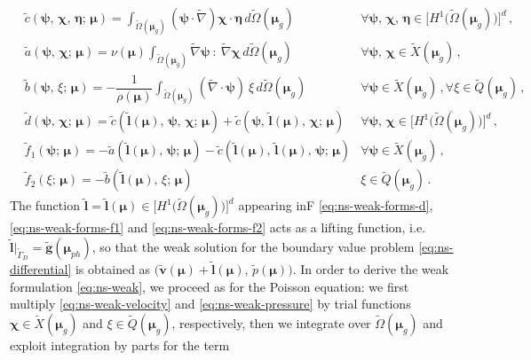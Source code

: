 \documentclass[12pt, a4paper, twoside, openright, notitlepage]{report}
\numberwithin{equation}{chapter}
\theoremstyle{theorem}
\theoremstyle{definition}
\theoremstyle{remark}
\theoremstyle{proposition}
\numberwithin{figure}{chapter}
\newcommand{\wt}[1]{\widetilde{#1}}
\newcommand{\bg}[1]{\boldsymbol{#1}}
\begin{document}
		\begin{subequations}
			\label{eq:ns-weak-forms}
			\begin{align}
				\label{eq:ns-weak-forms-c}
				& \wt{c}(\bg{\psi}, \, \bg{\chi}, \, \bg{\eta}; \, \bg{\mu}) = \int_{\wt{\Omega}(\bg{\mu}_g)} \left( \bg{\psi} \cdot \wt{\nabla} \right) \bg{\chi} \cdot \bg{\eta} \, d\wt{\Omega}(\bg{\mu}_g) & \forall \bg{\psi}, \, \bg{\chi}, \, \bg{\eta} \in \big[ H^1 \big( \wt{\Omega}(\bg{\mu}_g) \big) \big]^d \, , \\[0.2cm]
				\label{eq:ns-weak-forms-a}
				& \wt{a}(\bg{\psi}, \, \bg{\chi}; \, \bg{\mu}) = \nu(\bg{\mu}) \int_{\wt{\Omega}(\bg{\mu}_g)} \wt{\nabla} \bg{\psi} ~ : ~ \wt{\nabla} \bg{\chi} \, d\wt{\Omega}(\bg{\mu}_g) & \forall \bg{\psi}, \, \bg{\chi} \in \wt{X}(\bg{\mu}_g) \, , \\[0.2cm]
				\label{eq:ns-weak-forms-b}
				& \wt{b}(\bg{\psi}, \, \xi; \, \bg{\mu}) = - \dfrac{1}{\rho(\bg{\mu})} \int_{\wt{\Omega}(\bg{\mu}_g)} \left( \wt{\nabla} \cdot \bg{\psi} \right) ~ \xi \, d\wt{\Omega}(\bg{\mu}_g) & \forall \bg{\psi} \in \wt{X}(\bg{\mu}_g) \, , \forall \xi \in \wt{Q}(\bg{\mu}_g) \, , \\[0.2cm]
				\label{eq:ns-weak-forms-d}
				& \wt{d}(\bg{\psi}, \, \bg{\chi}; \, \bg{\mu}) = \wt{c}(\wt{\bg{l}}(\bg{\mu}), \, \bg{\psi}, \, \bg{\chi}; \, \bg{\mu}) + \wt{c}(\bg{\psi}, \, \wt{\bg{l}}(\bg{\mu}), \, \bg{\chi}; \, \bg{\mu}) & \forall \bg{\psi}, \, \bg{\chi} \in \big[ H^1 \big( \wt{\Omega}(\bg{\mu}_g) \big) \big]^d \, , \\[0.2cm]
				\label{eq:ns-weak-forms-f1}
				& \wt{f}_1(\bg{\psi}; \, \bg{\mu}) = -\wt{a}(\wt{\bg{l}}(\bg{\mu}), \, \bg{\psi}; \, \bg{\mu}) - \wt{c}(\wt{\bg{l}}(\bg{\mu}), \, \wt{\bg{l}}(\bg{\mu}), \, \bg{\psi}; \, \bg{\mu}) & \forall \bg{\psi} \in \wt{X}(\bg{\mu}_g) \, , \\[0.2cm]
				\label{eq:ns-weak-forms-f2}
				& \wt{f}_2(\xi; \, \bg{\mu}) = - \wt{b}(\wt{\bg{l}}(\bg{\mu}), \, \xi; \, \bg{\mu}) & \xi \in \wt{Q}(\bg{\mu}_g) \, .
			\end{align}
		\end{subequations}
		The function $\wt{\bg{l}} = \wt{\bg{l}}(\bg{\mu}) \in \big[ H^1 \big( \wt{\Omega}(\bg{\mu}_g) \big) \big]^d$ appearing inF \eqref{eq:ns-weak-forms-d}, \eqref{eq:ns-weak-forms-f1} and \eqref{eq:ns-weak-forms-f2} acts as a lifting function, i.e. $\wt{\bg{l}} \vert_{\wt{\Gamma}_D} = \wt{\bg{g}}(\bg{\mu}_{ph})$, so that the weak solution for the boundary value problem \eqref{eq:ns-differential} is obtained as $\big( \wt{\bg{v}}(\bg{\mu}) + \wt{\bg{l}}(\bg{\mu}), \, \wt{p}(\bg{\mu}) \big)$. In order to derive the weak formulation \eqref{eq:ns-weak}, we proceed as for the Poisson equation: we first multiply \eqref{eq:ns-weak-velocity} and \eqref{eq:ns-weak-pressure} by trial functions $\bg{\chi} \in \wt{X}(\bg{\mu}_g)$ and $\xi \in \wt{Q}(\bg{\mu}_g)$, respectively, then we integrate over $\wt{\Omega}(\bg{\mu}_g)$ and exploit integration by parts for the term
\end{document}
